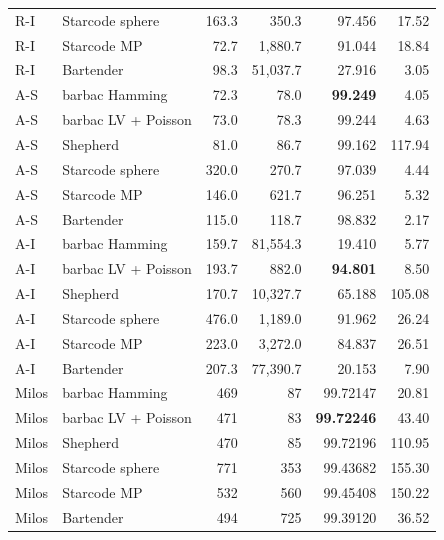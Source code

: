 \begin{longtable}{llrrrr}
R-I & Starcode sphere & 163.3 & 350.3 & 97.456 & 17.52 \\
R-I & Starcode MP & 72.7 & 1,880.7 & 91.044 & 18.84 \\
R-I & Bartender & 98.3 & 51,037.7 & 27.916 & 3.05 \\
A-S & barbac Hamming & 72.3 & 78.0 & \textbf{99.249} & 4.05 \\
A-S & barbac LV + Poisson & 73.0 & 78.3 & 99.244 & 4.63 \\
A-S & Shepherd & 81.0 & 86.7 & 99.162 & 117.94 \\
A-S & Starcode sphere & 320.0 & 270.7 & 97.039 & 4.44 \\
A-S & Starcode MP & 146.0 & 621.7 & 96.251 & 5.32 \\
A-S & Bartender & 115.0 & 118.7 & 98.832 & 2.17 \\
A-I & barbac Hamming & 159.7 & 81,554.3 & 19.410 & 5.77 \\
A-I & barbac LV + Poisson & 193.7 & 882.0 & \textbf{94.801} & 8.50 \\
A-I & Shepherd & 170.7 & 10,327.7 & 65.188 & 105.08 \\
A-I & Starcode sphere & 476.0 & 1,189.0 & 91.962 & 26.24 \\
A-I & Starcode MP & 223.0 & 3,272.0 & 84.837 & 26.51 \\
A-I & Bartender & 207.3 & 77,390.7 & 20.153 & 7.90 \\
Milos & barbac Hamming & 469 & 87 & 99.72147 & 20.81 \\
Milos & barbac LV + Poisson & 471 & 83 & \textbf{99.72246} & 43.40 \\
Milos & Shepherd & 470 & 85 & 99.72196 & 110.95 \\
Milos & Starcode sphere & 771 & 353 & 99.43682 & 155.30 \\
Milos & Starcode MP & 532 & 560 & 99.45408 & 150.22 \\
Milos & Bartender & 494 & 725 & 99.39120 & 36.52 \\
\bottomrule
\end{longtable}
